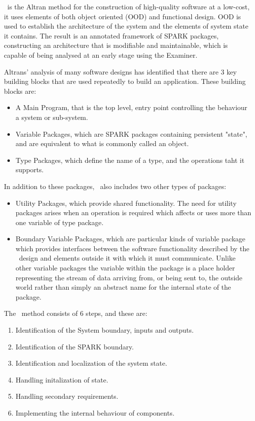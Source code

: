 \label{INFORMEDOverview}
\informed\ is the Altran method for the construction of high-quality
software at a low-cost, it uses elements of both object oriented (OOD) and functional
 design. OOD is used to establish the architecture of the system and the
 elements of system state it contains. The result is an annotated framework
 of SPARK packages, constructing an architecture that is modifiable and
 maintainable, which is capable of being analysed at an early stage using the Examiner.

Altrans' analysis of many software designs has identified that there are 3 key building
 blocks that are used repeatedly to build an application. These building blocks are:
   \begin{itemize}
  \item A Main Program, that is the top level, entry point controlling the behaviour
   a system or sub-system.
  \item Variable Packages, which are SPARK packages containing persistent "state",
   and are equivalent to what is commonly called an object.
  \item Type Packages, which define the name of a type, and the operations taht
  it supports.
  \end{itemize}

In addition to these packages, \informed\ also includes two other types of packages:
   \begin{itemize}
  \item Utility Packages, which provide shared functionality. The need for utility packages
  arises when an operation is required which affects or uses more than one variable of type
  package.
  \item Boundary Variable Packages, which are particular kinds of variable package which
  provides interfaces between the software functionality described by the \informed\ design
  and elements outside it with which it must communicate. Unlike other variable packages the
  variable within the package is a place holder representing the stream of data arriving from,
  or being sent to, the outside world rather than simply an abstract name for the internal state
  of the package.
  \end{itemize}

The \informed\ method consists of 6 steps, and these are:
   \begin{enumerate}
  \item Identification of the System boundary, inputs and outputs.
  \item Identification of the SPARK boundary.
  \item Identification and localization of the system state.
  \item Handling initalization of state.
  \item Handling secondary requirements.
  \item Implementing the internal behaviour of components.
  \end{enumerate}

